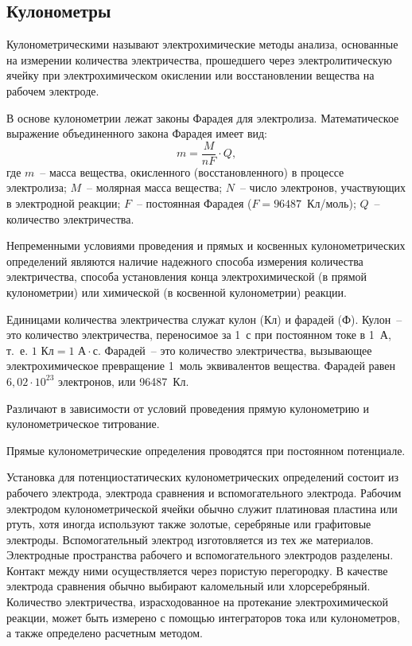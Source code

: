 \documentclass[pscyr,titlepage]{hedreport}
\begin{document}
  \subsection{Кулонометры}

  Кулонометрическими называют электрохимические методы анализа, основанные на
  измерении количества электричества, прошедшего через электролитическую ячейку
  при электрохимическом окислении или восстановлении вещества на рабочем
  электроде.

  В основе кулонометрии лежат законы Фарадея для электролиза. Математическое
  выражение объединенного закона Фарадея имеет вид:
  \[
    m = \frac{M}{nF}\cdot Q,
  \]
  где \( m \)~-- масса вещества, окисленного (восстановленного) в процессе
  электролиза; \( M \)~-- молярная масса вещества; \( N \)~-- число электронов,
  участвующих в электродной реакции; \( F \)~-- постоянная Фарадея
  (\( F = 96487 \)~Кл/моль); \( Q \)~-- количество электричества.

  Непременными условиями проведения и прямых и косвенных кулонометрических
  определений являются наличие надежного способа измерения количества
  электричества, способа установления конца электрохимической (в прямой
  кулонометрии) или химической (в косвенной кулонометрии) реакции.

  Единицами количества электричества служат кулон (Кл) и фарадей (Ф). Кулон~--
  это количество электричества, переносимое за 1~с при постоянном токе в 1~А,
  т.~е. \( 1\text{ Кл} = 1 \text{ А}\cdot\text{с} \). Фарадей~-- это количество
  электричества, вызывающее электрохимическое превращение 1~моль эквивалентов
  вещества. Фарадей равен \( 6,\!02\cdot10^{23} \) электронов, или 96487~Кл.

  Различают в зависимости от условий проведения прямую кулонометрию и
  кулонометрическое титрование.

  Прямые кулонометрические определения проводятся при постоянном потенциале.

  Установка для потенциостатических кулонометрических определений состоит из
  рабочего электрода, электрода сравнения и вспомогательного электрода. Рабочим
  электродом кулонометрической ячейки обычно служит платиновая пластина или
  ртуть, хотя иногда используют также золотые, серебряные или графитовые
  электроды. Вспомогательный электрод изготовляется из тех же материалов.
  Электродные пространства рабочего и вспомогательного электродов разделены.
  Контакт между ними осуществляется через пористую перегородку. В качестве
  электрода сравнения обычно выбирают каломельный или хлорсеребряный. Количество
  электричества, израсходованное на протекание электрохимической реакции, может
  быть измерено с помощью интеграторов тока или кулонометров, а также определено
  расчетным методом.
\end{document}
